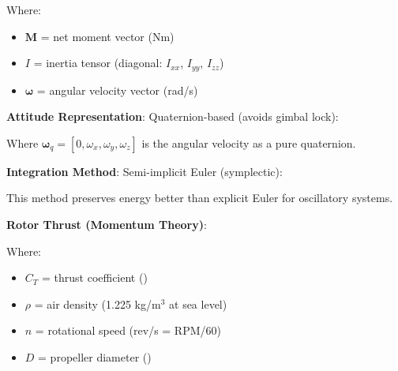 \unclass Where:
\begin{itemize}
	\item \unclass $\mathbf{M}$ = net moment vector (Nm)
	\item \unclass $I$ = inertia tensor (diagonal: $I_{xx}$, $I_{yy}$, $I_{zz}$)
	\item \unclass $\boldsymbol{\omega}$ = angular velocity vector (rad/s)
\end{itemize}

\unclass \textbf{Attitude Representation}: Quaternion-based (avoids gimbal lock):


\unclass Where $\boldsymbol{\omega}_q = [0, \omega_x, \omega_y, \omega_z]$ is the angular velocity as a pure quaternion.

\unclass \textbf{Integration Method}: Semi-implicit Euler (symplectic):


\unclass This method preserves energy better than explicit Euler for oscillatory systems.

\unclass \textbf{Rotor Thrust (Momentum Theory)}:


\unclass Where:
\begin{itemize}
	\item \unclass $C_T$ = thrust coefficient (\thrustCoefficient)
	\item \unclass $\rho$ = air density (1.225 kg/m$^3$ at sea level)
	\item \unclass $n$ = rotational speed (rev/s = RPM/60)
	\item \unclass $D$ = propeller diameter (\propDiameter)
\end{itemize}

